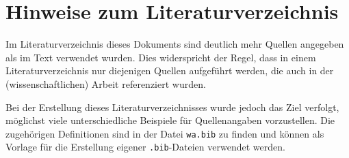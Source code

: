 \chapter{Hinweise zum Literaturverzeichnis}

Im Literaturverzeichnis dieses Dokuments sind deutlich mehr Quellen angegeben als im 
Text verwendet wurden. Dies widerspricht der Regel, dass in einem Literaturverzeichnis 
nur diejenigen Quellen aufgef\"uhrt werden, die auch in der (wissenschaftlichen) Arbeit 
referenziert wurden. 

Bei der Erstellung dieses Literaturverzeichnisses wurde jedoch das Ziel verfolgt, 
m\"oglichst viele unterschiedliche Beispiele f\"ur Quellenangaben vorzustellen. 
Die zugeh\"origen Definitionen sind in der Datei \texttt{wa.bib} zu finden und 
k\"onnen als Vorlage f\"ur die Erstellung eigener \texttt{.bib}-Dateien verwendet 
werden. 